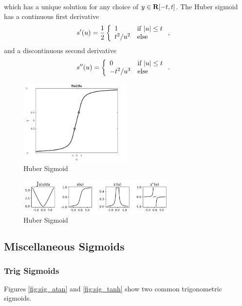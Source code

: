 \documentclass{article}
\begin{document}
    which has a unique solution for any choice of $y\in\textbf{R}[-t,t]$.
    The Huber sigmoid has a continuous first derivative
    \begin{align*}
        s'(u)
        &=\frac{1}{2}
        \left\{\begin{array}{lllllllllllllllllll}1 & \text{if $|u|\leq t$} \\ t^2/u^2 & \text{else}\end{array}\right.,
    \end{align*}
    and a discontinuous second derivative
    \begin{align*}
        s''(u)
        &=\left\{\begin{array}{lllllllllllllllllll}0 & \text{if $|u|\leq t$} \\ -t^2/u^3 & \text{else}\end{array}\right..
    \end{align*}
    \begin{figure}[h!]
        \centering
        \includegraphics[width=0.5\textwidth]{./figs/nn/huber_sigmoid.png}
        \caption{Huber Sigmoid}
        \label{fig:huber_sigmoid}
    \end{figure}
    \begin{figure}[h!]
        \centering
        \includegraphics[width=0.7\textwidth]{./figs/nn/sig/Huber.png}
        \caption{Huber Sigmoid}
        \label{fig:sig_Huber}
    \end{figure}
    \clearpage

\subsection{Miscellaneous Sigmoids}

\subsubsection{Trig Sigmoids}

Figures \ref{fig:sig_atan} and \ref{fig:sig_tanh} show two common trigonometric sigmoids.
\end{document}
